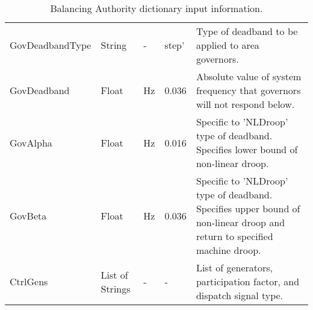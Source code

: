 \begin{landscape}
\begin{table}[!ht]
\begin{tabular}{@{} llllp{4in} @{}}
		GovDeadbandType	&	String	&	-	&	step'	&	Type of deadband to be applied to area governors.	\\
		GovDeadband	&	Float	&	Hz	&	0.036	&	Absolute value of system frequency that governors will not respond below.	\\
		GovAlpha	&	Float	&	Hz	&	0.016	&	Specific to 'NLDroop' type of deadband. Specifies lower bound of non-linear droop.	\\
		GovBeta	&	Float	&	Hz	&	0.036	&	Specific to 'NLDroop' type of deadband. Specifies upper  bound of non-linear droop and return to specified machine droop.	\\
		CtrlGens	&	List of Strings	&	-	&	-	&	List of generators, participation factor, and dispatch signal type.	\\
		\bottomrule
	\end{tabular}
	\caption{Balancing Authority dictionary input information.}
	\label{tab:BADict}
\end{table}
\end{landscape}